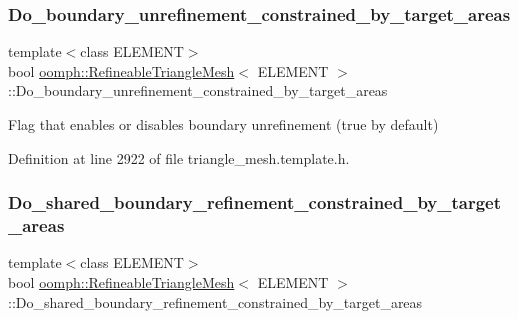 \subsubsection{\texorpdfstring{Do\+\_\+boundary\+\_\+unrefinement\+\_\+constrained\+\_\+by\+\_\+target\+\_\+areas}{Do\_boundary\_unrefinement\_constrained\_by\_target\_areas}}
{\footnotesize\ttfamily template$<$class E\+L\+E\+M\+E\+NT$>$ \\
bool \hyperlink{classoomph_1_1RefineableTriangleMesh}{oomph\+::\+Refineable\+Triangle\+Mesh}$<$ E\+L\+E\+M\+E\+NT $>$\+::Do\+\_\+boundary\+\_\+unrefinement\+\_\+constrained\+\_\+by\+\_\+target\+\_\+areas\hspace{0.3cm}{\ttfamily [protected]}}



Flag that enables or disables boundary unrefinement (true by default) 



Definition at line 2922 of file triangle\+\_\+mesh.\+template.\+h.

\mbox{\label{classoomph_1_1RefineableTriangleMesh_ab6a6a7aa732c31a8895ad502466ab242}} 
\subsubsection{\texorpdfstring{Do\+\_\+shared\+\_\+boundary\+\_\+refinement\+\_\+constrained\+\_\+by\+\_\+target\+\_\+areas}{Do\_shared\_boundary\_refinement\_constrained\_by\_target\_areas}}
{\footnotesize\ttfamily template$<$class E\+L\+E\+M\+E\+NT$>$ \\
bool \hyperlink{classoomph_1_1RefineableTriangleMesh}{oomph\+::\+Refineable\+Triangle\+Mesh}$<$ E\+L\+E\+M\+E\+NT $>$\+::Do\+\_\+shared\+\_\+boundary\+\_\+refinement\+\_\+constrained\+\_\+by\+\_\+target\+\_\+areas\hspace{0.3cm}{\ttfamily [protected]}}



